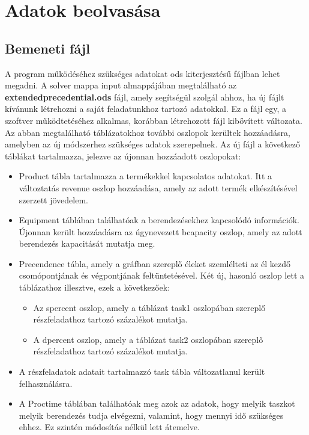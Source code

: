 \section{Adatok beolvasása}
\subsection{Bemeneti fájl}
A program működéséhez szükséges adatokat ods kiterjesztésű fájlban lehet megadni. A solver mappa input almappájában megtalálható az \textbf{extended\textunderscore precedential.ods} fájl, amely segítségül szolgál ahhoz, ha új fájlt kívánunk létrehozni a saját feladatunkhoz tartozó adatokkal. Ez a fájl egy, a szoftver működtetéséhez alkalmas, korábban létrehozott fájl kibővített változata. Az abban megtalálható táblázatokhoz további oszlopok kerültek hozzáadásra, amelyben az új módszerhez szükséges adatok szerepelnek. Az új fájl a következő táblákat tartalmazza, jelezve az újonnan hozzáadott oszlopokat:
\begin{itemize}
  \item Product tábla tartalmazza a termékekkel kapcsolatos adatokat. Itt a változtatás revenue oszlop hozzáadása, amely az adott termék elkészítésével szerzett jövedelem.
  \item Equipment táblában találhatóak a berendezésekhez kapcsolódó információk. Újonnan került hozzáadásra az úgynevezett b\textunderscore capacity oszlop, amely az adott berendezés kapacitását mutatja meg.
  \item Precendence tábla, amely a gráfban szereplő éleket szemlélteti az él kezdő csomópontjának és végpontjának feltüntetésével. Két új, hasonló oszlop lett a táblázathoz illesztve, ezek a következőek:
  	\begin{itemize}
  		\item Az s\textunderscore percent oszlop, amely a táblázat task1 oszlopában szereplő részfeladathoz tartozó százalékot mutatja.
  		\item A d\textunderscore percent oszlop, amely a táblázat task2 oszlopában szereplő részfeladathoz tartozó százalékot mutatja.
  	\end{itemize}
  	\item A részfeladatok adatait tartalmazzó task tábla változatlanul került felhasználásra.
  	\item A Proctime táblában találhatóak meg azok az adatok, hogy melyik taszkot melyik berendezés tudja elvégezni, valamint, hogy mennyi idő szükséges ehhez. Ez szintén módosítás nélkül lett átemelve.
\end{itemize}
